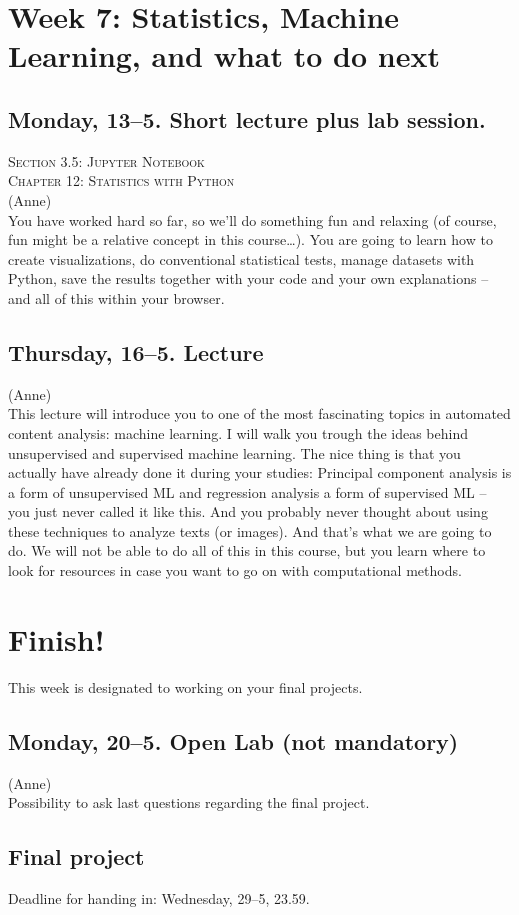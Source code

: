 \section*{Week 7: Statistics, Machine Learning, and what to do next}

\subsection*{Monday, 13--5. Short lecture plus lab session.}
\textsc{ Section 3.5: Jupyter Notebook}\\
\textsc{ Chapter 12: Statistics with Python}\\
{\footnotesize{(Anne)}\\}
You have worked hard so far, so we'll do something fun and relaxing (of course, fun might be a relative concept in this course\ldots). You are going to learn how to create visualizations, do conventional statistical tests, manage datasets with Python, save the results together with your code and your own explanations -- and all of this within your browser.

\subsection*{Thursday, 16--5. Lecture}

{\footnotesize{(Anne)}\\}
This lecture will introduce you to one of the most fascinating topics in automated content analysis: machine learning. I will walk you trough the ideas behind unsupervised and supervised machine learning. The nice thing is that you actually have already done it during your studies: Principal component analysis is a form of unsupervised ML and regression analysis a form of supervised ML -- you just never called it like this. And you probably never thought about using these techniques to analyze texts (or images). And that's what we are going to do.
We will not be able to do all of this in this course, but you learn where to look for resources in case you want to go on with computational methods.

\section*{Finish!}
This week is designated to working on your final projects. 

\subsection*{Monday, 20--5. Open Lab (not mandatory)}
{\footnotesize{(Anne)}\\}
Possibility to ask last questions regarding the final project.

\subsection*{Final project}
Deadline for handing in: Wednesday, 29--5, 23.59.
